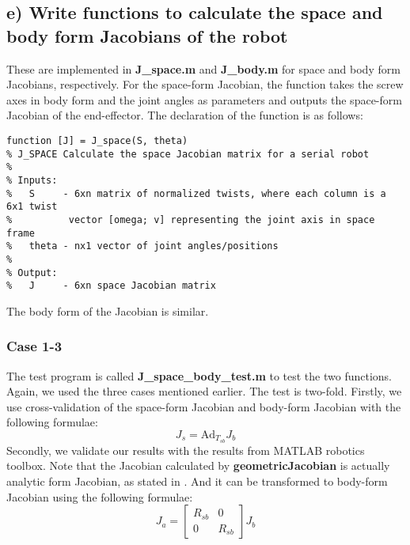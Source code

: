 \documentclass[english,10pt,a4paper]{article}
\begin{document}
    \subsection*{e) Write functions to calculate the space and body form Jacobians of the robot}
These are implemented in \textbf{J\_space.m} and \textbf{J\_body.m} for space and body form Jacobians, respectively. For the space-form Jacobian, the function takes the screw axes in body form and the joint angles as parameters and outputs the space-form Jacobian of the end-effector. The declaration of the function is as follows:
    \begin{lstlisting}[style=matlab]
function [J] = J_space(S, theta)
% J_SPACE Calculate the space Jacobian matrix for a serial robot
%
% Inputs:
%   S     - 6xn matrix of normalized twists, where each column is a 6x1 twist
%          vector [omega; v] representing the joint axis in space frame
%   theta - nx1 vector of joint angles/positions
%
% Output:
%   J     - 6xn space Jacobian matrix
\end{lstlisting}
    The body form of the Jacobian is similar.
    \subsubsection*{Case 1-3}
    The test program is called \textbf{J\_space\_body\_test.m} to test the two functions. Again, we used the three cases mentioned earlier. The test is two-fold. Firstly, we use cross-validation of the space-form Jacobian and body-form Jacobian with the following formulae:
    \[J_s = \text{Ad}_{T_{sb}} J_b\]
    Secondly, we validate our results with the results from MATLAB robotics toolbox. Note that the Jacobian calculated by \textbf{geometricJacobian} is actually analytic form Jacobian, as stated in \cite{Lynch_Park_2017}. And it can be transformed to body-form Jacobian using the following formulae:
    \[J_a = \begin{bmatrix}
        R_{sb} & 0 \\
        0 & R_{sb}
    \end{bmatrix} J_b\]
\end{document}

